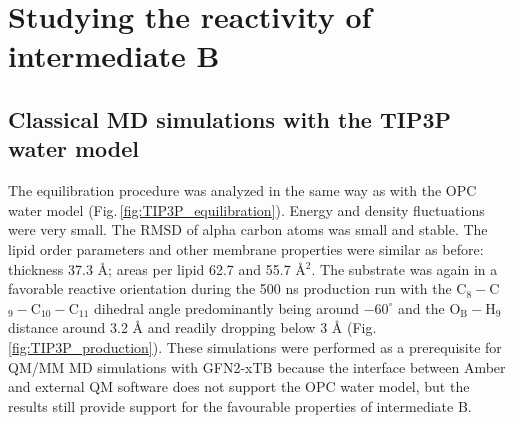 \section{Studying the reactivity of intermediate B} 
\subsection{Classical MD simulations with the TIP3P water model}
The equilibration procedure was analyzed in the same way as with the OPC water model (Fig.\,\ref{fig:TIP3P_equilibration}). Energy and density fluctuations were very small. The RMSD of alpha carbon atoms was small and stable. The lipid order parameters and other membrane properties were similar as before: thickness 37.3 Å; areas per lipid 62.7 and 55.7 Å$^2$. The substrate was again in a favorable reactive orientation during the 500 ns production run with the C$_8-$C$_9-$C$_{10}-$C$_{11}$ dihedral angle predominantly being around $-60^{\circ}$ and the O$_{\text{B}}-$H$_{\text{9}}$ distance around 3.2 Å and readily dropping below 3 Å (Fig.\,\ref{fig:TIP3P_production}). These simulations were performed as a prerequisite for QM/MM MD simulations with GFN2-xTB because the interface between Amber and external QM software does not support the OPC water model, but the results still provide support for the favourable properties of intermediate B. 

